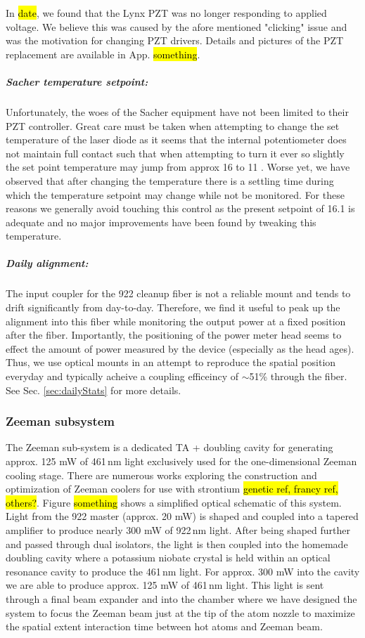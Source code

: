 In \hl{date}, we found that the Lynx PZT was no longer responding to applied voltage.
We believe this was caused by the afore mentioned "clicking" issue and was the motivation for changing PZT drivers.
Details and pictures of the PZT replacement are available in App. \hl{something}.

\subparagraph{Sacher temperature setpoint:}
Unfortunately, the woes of the Sacher equipment have not been limited to their PZT controller.
Great care must be taken when attempting to change the set temperature of the laser diode as it seems that the internal potentiometer does not maintain full contact such that when attempting to turn it ever so slightly the set point temperature may jump from approx 16 \degreeC to 11 \degreeC.
Worse yet, we have observed that after changing the temperature there is a settling time during which the temperature setpoint may change while not be monitored.
For these reasons we generally avoid touching this control as the present setpoint of 16.1 \degreeC is adequate and no major improvements have been found by tweaking this temperature.

\subparagraph{Daily alignment:}
The input coupler for the 922 cleanup fiber is not a reliable mount and tends to drift significantly from day-to-day.
Therefore, we find it useful to peak up the alignment into this fiber while monitoring the output power at a fixed position after the fiber.
Importantly, the positioning of the power meter head seems to effect the amount of power measured by the device (especially as the head ages).
Thus, we use optical mounts in an attempt to reproduce the spatial position everyday and typically acheive a coupling efficeincy of $\sim$51\% through the fiber.
See Sec. \ref{sec:dailyStats} for more details.
		
\subsubsection{Zeeman subsystem}
The Zeeman sub-system is a dedicated TA + doubling cavity for generating approx. 125 mW of 461\,nm light exclusively used for the one-dimensional Zeeman cooling stage.
There are numerous works exploring the construction and optimization of Zeeman coolers for use with strontium \hl{genetic ref, francy ref, others?}.
Figure \hl{something} shows a simplified optical schematic of this system.
Light from the 922 master (approx. 20 mW) is shaped and coupled into a tapered amplifier to produce nearly 300 mW of 922\,nm light.
After being shaped further and passed through dual isolators, the light is then coupled into the homemade doubling cavity where a potassium niobate crystal is held within an optical resonance cavity to produce the 461\,nm light.
For approx. 300 mW into the cavity we are able to produce approx. 125 mW of 461\,nm light.
This light is sent through a final beam expander and into the chamber where we have designed the system to focus the Zeeman beam just at the tip of the atom nozzle to maximize the spatial extent interaction time between hot atoms and Zeeman beam.

